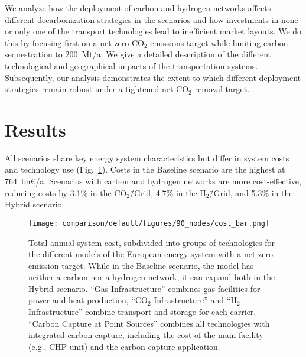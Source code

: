\documentclass[twocolumn]{article}
\newcommand{\carbon}{CO$_2$}
\newcommand{\hydrogen}{H$_2$}
\newcommand{\carbongrid}{CO$_2$\=/Grid}
\newcommand{\hydrogengrid}{H$_2$\=/Grid}
\newcommand{\baselinescenario}{Baseline scenario}
\newcommand{\hybridscenario}{Hybrid scenario}
\begin{document}
We analyze how the deployment of carbon and hydrogen networks affects different decarbonization strategies in the scenarios and how investments in none or only one of the transport technologies lead to inefficient market layouts. We do this by focusing first on a net-zero \carbon{} emissions target while limiting carbon sequestration to 200~Mt/a. We give a detailed description of the different technological and geographical impacts of the transportation systems. Subsequently, our analysis demonstrates the extent to which different deployment strategies remain robust under a tightened net \carbon{} removal target.


\section{Results}
\label{sec:results}


All scenarios share key energy system characteristics but differ in system costs and technology use (Fig.~\ref{fig:cost_bar}). Costs in the \baselinescenario{} are the highest at 764~bn€/a. Scenarios with carbon and hydrogen networks are more cost-effective, reducing costs by 3.1\% in the \carbongrid{}, 4.7\% in the \hydrogengrid{}, and 5.3\% in the \hybridscenario{}.

\begin{figure}[ht!]
    \centering
    \texttt{[image: comparison/default/figures/90\_nodes/cost\_bar.png]}
    \caption[short]{Total annual system cost, subdivided into groups of technologies for the different models of the European energy system with a net-zero emission target. While in the \baselinescenario{}, the model has neither a carbon nor a hydrogen network, it can expand both in the \hybridscenario{}. ``Gas Infrastructure'' combines gas facilities for power and heat production, ``\carbon{} Infrastructure'' and ``\hydrogen{} Infrastructure'' combine transport and storage for each carrier. ``Carbon Capture at Point Sources'' combines all technologies with integrated carbon capture, including the cost of the main facility (e.g., CHP unit) and the carbon capture application.}
    \label{fig:cost_bar}
\end{figure}

\end{document}
